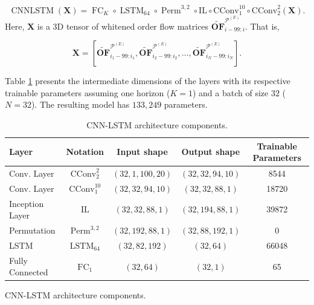 \documentclass[10pt,a4paper,oneside]{article}
\DeclareMathOperator{\perm}{Perm}
\DeclareMathOperator{\fullyconnected}{FC}
\DeclareMathOperator{\lstm}{LSTM}
\DeclareMathOperator{\cnnlstm}{CNNLSTM}
\providecommand{\DIFaddtex}[1]{{\protect\color{blue} \sf #1}} %
\providecommand{\DIFdeltex}[1]{{\protect\color{red} \scriptsize #1}} %
\providecommand{\DIFaddFL}[1]{\DIFadd{#1}} %
\providecommand{\DIFdelFL}[1]{\DIFdel{#1}} %
\providecommand{\DIFaddbeginFL}{} %
\providecommand{\DIFaddendFL}{} %
\providecommand{\DIFdelbeginFL}{} %
\providecommand{\DIFdelendFL}{} %
\providecommand{\DIFadd}[1]{\texorpdfstring{\DIFaddtex{#1}}{#1}} %
\providecommand{\DIFdel}[1]{\texorpdfstring{\DIFdeltex{#1}}{}} %
\newcommand{\DIFscaledelfig}{0.5}
\newlength{\DIFdelgraphicswidth} %
\newlength{\DIFdelgraphicsheight} %
\newcommand{\DIFaddincludegraphics}[2][]{{\color{blue}\fbox{\DIFOincludegraphics[#1]{#2}}}} %
\newcommand{\DIFdelincludegraphics}[2][]{%
\sbox{\DIFdelgraphicsbox}{\DIFOincludegraphics[#1]{#2}}%
\settoboxwidth{\DIFdelgraphicswidth}{\DIFdelgraphicsbox} %
\settoboxtotalheight{\DIFdelgraphicsheight}{\DIFdelgraphicsbox} %
\scalebox{\DIFscaledelfig}{%
\parbox[b]{\DIFdelgraphicswidth}{\usebox{\DIFdelgraphicsbox}\\[-\baselineskip] \rule{\DIFdelgraphicswidth}{0em}}\llap{\resizebox{\DIFdelgraphicswidth}{\DIFdelgraphicsheight}{%
\setlength{\unitlength}{\DIFdelgraphicswidth}%
\begin{picture}(1,1)%
\thicklines\linethickness{2pt} %
{\color[rgb]{1,0,0}\put(0,0){\framebox(1,1){}}}%
{\color[rgb]{1,0,0}\put(0,0){\line( 1,1){1}}}%
{\color[rgb]{1,0,0}\put(0,1){\line(1,-1){1}}}%
\end{picture}%
}\hspace*{3pt}}} %
} %
\DeclareRobustCommand{\DIFaddbeginFL}{\DIFOaddbeginFL \let\includegraphics\DIFaddincludegraphics} %
\DeclareRobustCommand{\DIFaddendFL}{\DIFOaddendFL \let\includegraphics\DIFOincludegraphics} %
\DeclareRobustCommand{\DIFdelbeginFL}{\DIFOdelbeginFL \let\includegraphics\DIFdelincludegraphics} %
\DeclareRobustCommand{\DIFdelendFL}{\DIFOaddendFL \let\includegraphics\DIFOincludegraphics} %
\begin{document}
$$
\cnnlstm(\mathbf{X}) = \fullyconnected_K \circ \lstm_{64} \circ \perm^{3, 2} \circ \mathrm{IL} \circ \mathrm{CConv}^{10}_1 \circ \mathrm{CConv}^{2}_2 \left(\mathbf{X}\right).
$$
Here, $\mathbf{X}$ is a 3D tensor of whitened order flow matrices $\widetilde{\mathbf{OF}}^{\mathcal{P}^{(E)}}_{i - 99:i}$. That is,

$$
\mathbf{X} = \left[ \widetilde{\mathbf{OF}}^{\mathcal{P}^{(E)}}_{i_1 - 99:i_1}, \widetilde{\mathbf{OF}}^{\mathcal{P}^{(E)}}_{i_2 - 99:i_2}, \dots, \widetilde{\mathbf{OF}}^{\mathcal{P}^{(E)}}_{i_N - 99:i_N}\right].
$$

Table \ref{tab:cnnlstm} presents the intermediate dimensions of the layers with its respective trainable parameters assuming one horizon ($K = 1$) and a batch of size $32$ ($N = 32$). The resulting model has $133,249$ parameters.


\begin{table}[htb]
  \DIFaddbeginFL \caption{\DIFaddFL{CNN-LSTM architecture components.}}
  \label{tab:cnnlstm}

\DIFaddendFL \centering
\begin{tabular}{@{}lcccc@{}}
\toprule
Layer           & Notation           & Input shape        & Output shape          & Trainable Parameters  \\ \midrule
Conv. Layer     & $\mathrm{CConv}^{2}_2$   & $(32, 1, 100, 20)$ & $(32,  32,  94, 10)$ & 8544           \\
Conv. Layer     & $\mathrm{CConv}^{10}_1$  & $(32, 32, 94, 10)$ & $(32, 32, 88, 1)$    & 18720           \\
Inception Layer & $\mathrm{IL}$            & $(32,  32, 88, 1)$ & $(32, 194, 88, 1)$   & 39872           \\
Permutation     & $\perm^{3,2}$            & $(32, 192, 88, 1)$ & $(32, 88, 192, 1)$   & 0               \\
LSTM            & $\lstm_{64}$             & $(32, 82, 192)$    & $(32, 64)$           & 66048           \\ 
Fully Connected & $\fullyconnected_{1}$    & $(32, 64)$         & $(32, 1)$            & 65   \\\bottomrule
\end{tabular}
\DIFdelbeginFL %
{%
\DIFdelFL{CNN-LSTM architecture components.}}
\DIFdelendFL \DIFaddbeginFL 

\DIFaddendFL \end{table}
\end{document}
